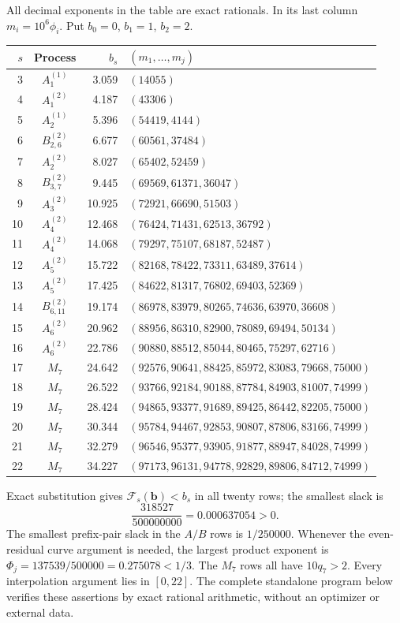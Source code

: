 \documentclass[11pt,reqno]{amsart}
\numberwithin{equation}{section}
\theoremstyle{definition}
\begin{document}
All decimal exponents in the table are exact rationals.  In its last column
$m_i=10^6\phi_i$.  Put $b_0=0$, $b_1=1$, $b_2=2$.
\begin{center}\small
\begin{tabular}{r c r l}
\hline
$s$&Process&$b_s$&$(m_1,\ldots,m_j)$\\\hline
3&$A_{1}^{(1)}$&3.059&$(14055)$\\
4&$A_{1}^{(2)}$&4.187&$(43306)$\\
5&$A_{2}^{(1)}$&5.396&$(54419,4144)$\\
6&$B_{2,6}^{(2)}$&6.677&$(60561,37484)$\\
7&$A_{2}^{(2)}$&8.027&$(65402,52459)$\\
8&$B_{3,7}^{(2)}$&9.445&$(69569,61371,36047)$\\
9&$A_{3}^{(2)}$&10.925&$(72921,66690,51503)$\\
10&$A_{4}^{(2)}$&12.468&$(76424,71431,62513,36792)$\\
11&$A_{4}^{(2)}$&14.068&$(79297,75107,68187,52487)$\\
12&$A_{5}^{(2)}$&15.722&$(82168,78422,73311,63489,37614)$\\
13&$A_{5}^{(2)}$&17.425&$(84622,81317,76802,69403,52369)$\\
14&$B_{6,11}^{(2)}$&19.174&$(86978,83979,80265,74636,63970,36608)$\\
15&$A_{6}^{(2)}$&20.962&$(88956,86310,82900,78089,69494,50134)$\\
16&$A_{6}^{(2)}$&22.786&$(90880,88512,85044,80465,75297,62716)$\\
17&$M_7$&24.642&$(92576,90641,88425,85972,83083,79668,75000)$\\
18&$M_7$&26.522&$(93766,92184,90188,87784,84903,81007,74999)$\\
19&$M_7$&28.424&$(94865,93377,91689,89425,86442,82205,75000)$\\
20&$M_7$&30.344&$(95784,94467,92853,90807,87806,83166,74999)$\\
21&$M_7$&32.279&$(96546,95377,93905,91877,88947,84028,74999)$\\
22&$M_7$&34.227&$(97173,96131,94778,92829,89806,84712,74999)$\\
\hline
\end{tabular}\end{center}

Exact substitution gives
$\mathcal F_s(\boldsymbol b)<b_s$ in all twenty rows; the smallest slack is
\[
           \frac{318527}{500000000}=0.000637054>0.
\]
The smallest prefix-pair slack in the $A/B$ rows is $1/250000$.
Whenever the even-residual curve argument is needed, the largest product
exponent is $\Phi_j=137539/500000=0.275078<1/3$.
The $M_7$ rows all have $10q_7>2$.  Every interpolation argument lies in
$[0,22]$.  The complete standalone program below verifies these assertions
by exact rational arithmetic, without an optimizer or external data.
\end{document}

